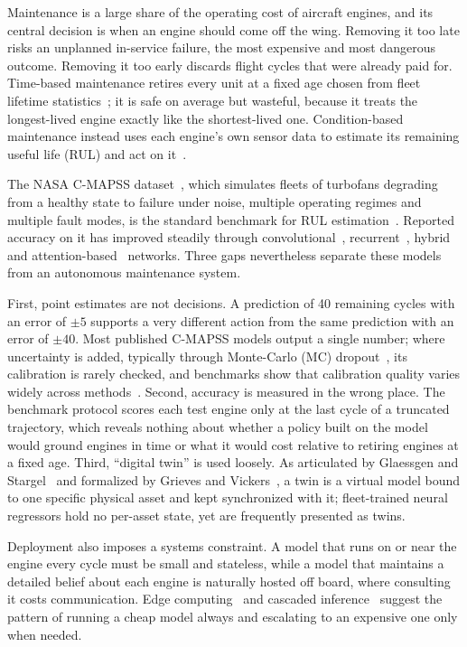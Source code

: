 \documentclass[pdflatex,sn-mathphys-num]{sn-jnl}
\begin{document}
Maintenance is a large share of the operating cost of aircraft engines, and its central decision is when an engine should come off the wing. Removing it too late risks an unplanned in-service failure, the most expensive and most dangerous outcome. Removing it too early discards flight cycles that were already paid for. Time-based maintenance retires every unit at a fixed age chosen from fleet lifetime statistics~\cite{barlow1960optimum}; it is safe on average but wasteful, because it treats the longest-lived engine exactly like the shortest-lived one. Condition-based maintenance instead uses each engine's own sensor data to estimate its remaining useful life (RUL) and act on it~\cite{jardine2006review,lei2018review}.

The NASA C-MAPSS dataset~\cite{saxena2008damage}, which simulates fleets of turbofans degrading from a healthy state to failure under noise, multiple operating regimes and multiple fault modes, is the standard benchmark for RUL estimation~\cite{ramasso2014benchmark}. Reported accuracy on it has improved steadily through convolutional~\cite{babu2016cnn,li2018dcnn}, recurrent~\cite{zheng2017lstm}, hybrid~\cite{aldulaimi2019hdnn} and attention-based~\cite{ragab2020ats2s} networks. Three gaps nevertheless separate these models from an autonomous maintenance system.

First, point estimates are not decisions. A prediction of 40 remaining cycles with an error of $\pm5$ supports a very different action from the same prediction with an error of $\pm40$. Most published C-MAPSS models output a single number; where uncertainty is added, typically through Monte-Carlo (MC) dropout~\cite{gal2016dropout}, its calibration is rarely checked, and benchmarks show that calibration quality varies widely across methods~\cite{basora2023uqbench}. Second, accuracy is measured in the wrong place. The benchmark protocol scores each test engine only at the last cycle of a truncated trajectory, which reveals nothing about whether a policy built on the model would ground engines in time or what it would cost relative to retiring engines at a fixed age. Third, ``digital twin'' is used loosely. As articulated by Glaessgen and Stargel~\cite{glaessgen2012digital} and formalized by Grieves and Vickers~\cite{grieves2017digital}, a twin is a virtual model bound to one specific physical asset and kept synchronized with it; fleet-trained neural regressors hold no per-asset state, yet are frequently presented as twins.

Deployment also imposes a systems constraint. A model that runs on or near the engine every cycle must be small and stateless, while a model that maintains a detailed belief about each engine is naturally hosted off board, where consulting it costs communication. Edge computing~\cite{shi2016edge} and cascaded inference~\cite{teerapittayanon2016branchynet} suggest the pattern of running a cheap model always and escalating to an expensive one only when needed.
\end{document}
